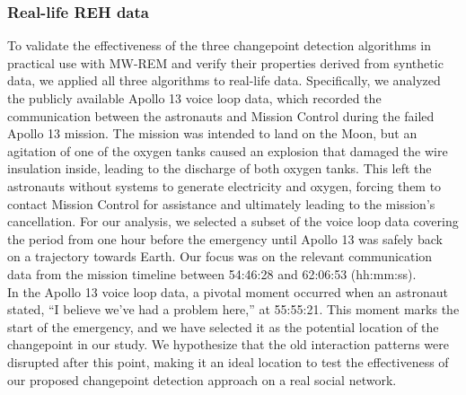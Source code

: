 \documentclass[]{interact}
\theoremstyle{plain}%
\theoremstyle{definition}
\theoremstyle{remark}
\begin{document}
    \subsubsection{Real-life REH data} \label{sec:Apollo 13 intro}
    
    \hspace{0.2cm} To validate the effectiveness of the three changepoint detection algorithms in practical use with MW-REM and verify their properties derived from synthetic data, we applied all three algorithms to real-life data. Specifically, we analyzed the publicly available Apollo 13 voice loop data, which recorded the communication between the astronauts and Mission Control during the failed Apollo 13 mission. The mission was intended to land on the Moon, but an agitation of one of the oxygen tanks caused an explosion that damaged the wire insulation inside, leading to the discharge of both oxygen tanks. This left the astronauts without systems to generate electricity and oxygen, forcing them to contact Mission Control for assistance and ultimately leading to the mission's cancellation. For our analysis, we selected a subset of the voice loop data covering the period from one hour before the emergency until Apollo 13 was safely back on a trajectory towards Earth. Our focus was on the relevant communication data from the mission timeline between 54:46:28 and 62:06:53 (hh:mm:ss). \\
    
    In the Apollo 13 voice loop data, a pivotal moment occurred when an astronaut stated, ``I believe we've had a problem here,'' at 55:55:21. This moment marks the start of the emergency, and we have selected it as the potential location of the changepoint in our study. We hypothesize that the old interaction patterns were disrupted after this point, making it an ideal location to test the effectiveness of our proposed changepoint detection approach on a real social network. \\
    
\end{document}
